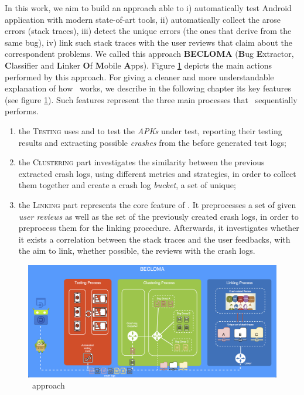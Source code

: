 \label{chapter:approach}
In this work, we aim to build an approach able to i) automatically test Android application with modern state-of-art tools, ii) automatically collect the arose errors (\ie stack traces), iii) detect the unique errors (\ie the ones that derive from the same bug), iv) link such stack traces with the user reviews that claim about the correspondent problems.           
We called this approach \textbf{BECLOMA} (\textbf{B}ug \textbf{E}xtractor, \textbf{C}lassifier and \textbf{L}inker \textbf{O}f \textbf{M}obile \textbf{A}pps).
Figure \ref{fig: becloma} depicts the main actions performed by this approach.
For giving a cleaner and more understandable explanation of how \toolname\ works, we describe in the following chapter its key features (see figure \ref{fig: becloma}). Such features represent the three main processes that \toolname\ sequentially performs.
\begin{enumerate}
\item the \textsc{Testing} uses \monkey and \sapienz to test the \textit{APKs} under test, reporting their testing results and extracting possible \textit{crashes} from the before generated test logs; 

\item the \textsc{Clustering} part investigates the similarity between the previous extracted crash logs, using different metrics and strategies, in order to collect them together and create a crash log \textit{bucket}, \ie a set of unique; 

\item the \textsc{Linking} part represents the core feature of \toolname. It preprocesses a set of given \textit{user reviews} as well as the set of the previously created crash logs, in order to preprocess them for the linking procedure. Afterwards, it investigates whether it exists a correlation between the stack traces and the user feedbacks, with the aim to link, whether possible, the reviews with the crash logs. 
\end{enumerate}
\begin{figure}[tb]
\centering 
\includegraphics[width=\columnwidth]{diagrams/becloma_approach_img} 
\caption{\toolname\ approach}
\label{fig: becloma}
\end{figure}


